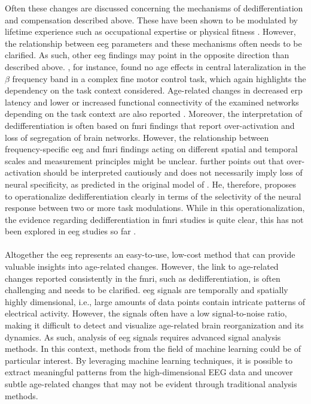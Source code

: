 Often these changes are discussed concerning the mechanisms of dedifferentiation and compensation described above. These have been shown to be modulated by lifetime experience such as occupational expertise \cite{Vieluf2018} or physical fitness \cite{Douw2014}. However, the relationship between \gls{eeg} parameters and these mechanisms often needs to be clarified. As such, other \gls{eeg} findings may point in the opposite direction than described above. \citeauthor{Hübner2018a} \cite{Hübner2018a}, for instance, found no age effects in central lateralization in the $\beta$ frequency band in a complex fine motor control task, which again highlights the dependency on the task context considered. Age-related changes in decreased \gls{erp} latency and lower or increased functional connectivity of the examined networks depending on the task context are also reported \cite{Courtney2021}. Moreover, the interpretation of dedifferentiation is often based on \gls{fmri} findings that report over-activation and loss of segregation of brain networks. However, the relationship between frequency-specific \gls{eeg} and \gls{fmri} findings acting on different spatial and temporal scales and measurement principles might be unclear. \citeauthor{Koen2019} \cite{Koen2019} further points out that over-activation should be interpreted cautiously and does not necessarily imply loss of neural specificity, as predicted in the original model of \citeauthor{Li2000} \cite{Li2000}. He, therefore, proposes to operationalize dedifferentiation clearly in terms of the selectivity of the neural response between two or more task modulations. While in this operationalization, the evidence regarding dedifferentiation in \gls{fmri} studies is quite clear, this has not been explored in \gls{eeg} studies so far \cite{Koen2019}.\\
\\
Altogether the \gls{eeg} represents an easy-to-use, low-cost method that can provide valuable insights into age-related changes. However, the link to age-related changes reported consistently in the \gls{fmri}, such as dedifferentiation, is often challenging and needs to be clarified. \Gls{eeg} signals are temporally and spatially highly dimensional, i.e., large amounts of data points contain intricate patterns of electrical activity. However, the signals often have a low signal-to-noise ratio, making it difficult to detect and visualize age-related brain reorganization and its dynamics. As such, analysis of \gls{eeg} signals requires advanced signal analysis methods. In this context, methods from the field of machine learning could be of particular interest. By leveraging machine learning techniques, it is possible to extract meaningful patterns from the high-dimensional EEG data and uncover subtle age-related changes that may not be evident through traditional analysis methods.
